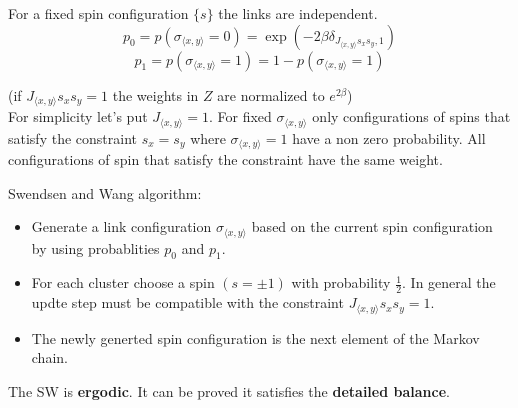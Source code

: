 \documentclass[12pt,handout]{beamer}
\begin{document}
\begin{frame}
\begin{center}

For a fixed spin configuration $\lbrace s \rbrace$ the links are independent.
\[
p_0 = p \left( \sigma_{\langle x, y \rangle} = 0 \right)  = \exp \left( - 2 \beta \delta_{J_{\langle x, y \rangle} s_x s_y, 1} \right)
\]
\[
p_1 = p \left( \sigma_{\langle x, y \rangle} = 1 \right) = 1 - p \left( \sigma_{\langle x, y \rangle} = 1 \right)
\]

(if $J_{\langle x, y \rangle} s_x s_y = 1$ the weights in $Z$ are normalized to $e^{2 \beta}$)\\
\vspace{30pt}
For simplicity let's put $J_{\langle x, y \rangle} = 1$. For fixed $\sigma_{\langle x, y \rangle}$ only
configurations of spins that satisfy the constraint $s_x = s_y$ where $\sigma_{\langle x, y \rangle} = 1$ have a non zero probability. All configurations of spin that satisfy the constraint have the same weight.

\end{center}
\end{frame}

\begin{frame}
\begin{center}
{\Large Swendsen and Wang algorithm:}

\begin{itemize}
\item Generate a link configuration $\sigma_{\langle x, y \rangle}$ based on the current spin configuration by using probablities $p_0$ and $p_1$. 
\item For each cluster choose a spin $\left( s = \pm 1 \right)$ with probability $\frac{1}{2}$. In general the updte step must be compatible with the constraint $J_{\langle x, y \rangle}  s_x s_y = 1$.
\item The newly generted spin configuration is the next element of the Markov chain.
\end{itemize}

\vspace{20pt}
The SW is \textbf{ergodic}. It can be proved it satisfies the \textbf{detailed balance}.

\end{center}
\end{frame}
\end{document}
